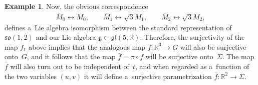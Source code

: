 \documentclass[pdftex]{sigma}
\numberwithin{equation}{section}
\theoremstyle{definition}
\newtheorem{exmpl}[teo]{Example}
\begin{document}
\begin{exmpl}
Now, the obvious correspondence
\begin{gather*}
\bar{M}_0 \leftrightarrow M_0,
\qquad
\bar{M}_1 \leftrightarrow \sqrt{3} M_1,
\qquad
\bar{M}_2 \leftrightarrow \sqrt{3} M_2,
\end{gather*}
def\/ines a~Lie algebra isomorphism between the standard representation of $\mathfrak{so}(1,2)$ and our Lie algebra
$\mathfrak{g} \subset \mathfrak{gl}(5,\mathbb{R})$.
Therefore, the surjectivity of the map $f_1$ above implies that the analogous map $f:\mathbb{R}^3 \to G$ will also be
surjective onto~$G$, and it follows that the map $\bar{f} = \pi \circ f$ will be surjective onto~$\Sigma$.
The map $\bar{f}$ will also turn out to be independent of~$t$, and when regarded as a~function of the two variables
$(u,v)$ it will def\/ine a~surjective parametrization $\bar{f}:\mathbb{R}^2 \to \Sigma$.


\end{exmpl}
\end{document}
